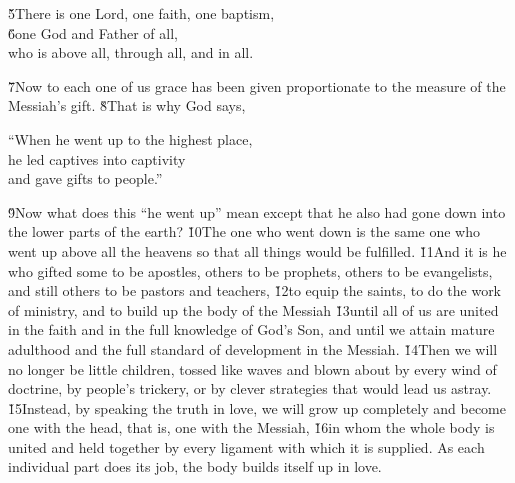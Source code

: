 \begin{poetry}
\poeml \v{5}There is one Lord, one faith, one baptism, \\
\poeml \v{6}one God and Father of all, \\
\poemlll       who is above all, through all, and in all.
\end{poetry}

\v{7}Now to each one of us grace has been given proportionate to the measure of the Messiah's gift. \v{8}That is why God says,

\begin{poetry}
\poeml ``When he went up to the highest place, \\
\poemll    he led captives into captivity \\
\poemlll       and gave gifts to people.''
\end{poetry}

\v{9}Now what does this ``he went up'' mean except that he also had gone down into the lower parts of the earth? \v{10}The one who went down is the same one who went up above all the heavens so that all things would be fulfilled. \v{11}And it is he who gifted some to be apostles, others to be prophets, others to be evangelists, and still others to be pastors and teachers, \v{12}to equip the saints, to do the work of ministry, and to build up the body of the Messiah \v{13}until all of us are united in the faith and in the full knowledge of God's Son, and until we attain mature adulthood and the full standard of development in the Messiah. \v{14}Then we will no longer be little children, tossed like waves and blown about by every wind of doctrine, by people's trickery, or by clever strategies that would lead us astray. \v{15}Instead, by speaking the truth in love, we will grow up completely and become one with the head, that is, one with the Messiah, \v{16}in whom the whole body is united and held together by every ligament with which it is supplied. As each individual part does its job, the body builds itself up in love.

